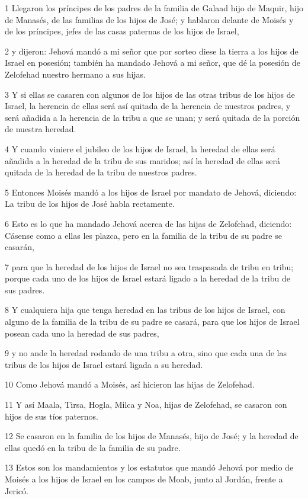 \par 1 Llegaron los príncipes de los padres de la familia de Galaad hijo de Maquir, hijo de Manasés, de las familias de los hijos de José; y hablaron delante de Moisés y de los príncipes, jefes de las casas paternas de los hijos de Israel,
\par 2 y dijeron: Jehová mandó a mi señor que por sorteo diese la tierra a los hijos de Israel en posesión; también ha mandado Jehová a mi señor, que dé la posesión de Zelofehad nuestro hermano a sus hijas.
\par 3 Y si ellas se casaren con algunos de los hijos de las otras tribus de los hijos de Israel, la herencia de ellas será así quitada de la herencia de nuestros padres, y será añadida a la herencia de la tribu a que se unan; y será quitada de la porción de nuestra heredad.
\par 4 Y cuando viniere el jubileo de los hijos de Israel, la heredad de ellas será añadida a la heredad de la tribu de sus maridos; así la heredad de ellas será quitada de la heredad de la tribu de nuestros padres.
\par 5 Entonces Moisés mandó a los hijos de Israel por mandato de Jehová, diciendo: La tribu de los hijos de José habla rectamente.
\par 6 Esto es lo que ha mandado Jehová acerca de las hijas de Zelofehad, diciendo: Cásense como a ellas les plazca, pero en la familia de la tribu de su padre se casarán,
\par 7 para que la heredad de los hijos de Israel no sea traspasada de tribu en tribu; porque cada uno de los hijos de Israel estará ligado a la heredad de la tribu de sus padres.
\par 8 Y cualquiera hija que tenga heredad en las tribus de los hijos de Israel, con alguno de la familia de la tribu de su padre se casará, para que los hijos de Israel posean cada uno la heredad de sus padres,
\par 9 y no ande la heredad rodando de una tribu a otra, sino que cada una de las tribus de los hijos de Israel estará ligada a su heredad.
\par 10 Como Jehová mandó a Moisés, así hicieron las hijas de Zelofehad.
\par 11 Y así Maala, Tirsa, Hogla, Milca y Noa, hijas de Zelofehad, se casaron con hijos de sus tíos paternos.
\par 12 Se casaron en la familia de los hijos de Manasés, hijo de José; y la heredad de ellas quedó en la tribu de la familia de su padre.
\par 13 Estos son los mandamientos y los estatutos que mandó Jehová por medio de Moisés a los hijos de Israel en los campos de Moab, junto al Jordán, frente a Jericó.


